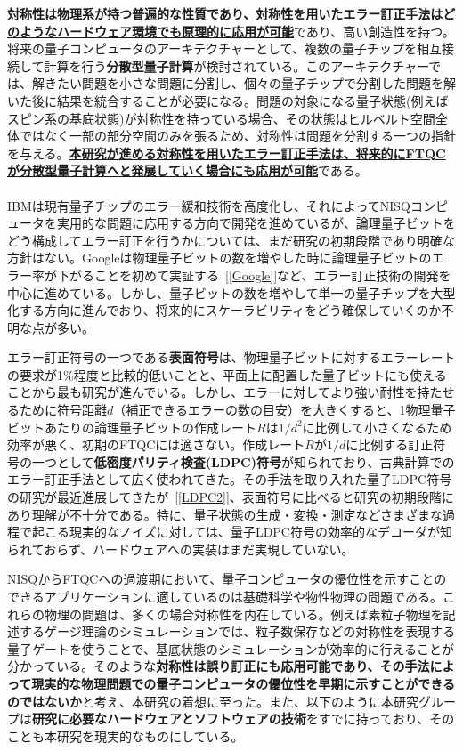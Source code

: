 \documentclass[11pt,a4j,dvipdfmx]{jarticle} 					%
\newcommand{\研究課題名}{誤り耐性量子コンピュータに向けた誤り訂正技術の開発(仮)}
\newcommand{\研究機関名}{東京大学}
\newcommand{\研究代表者氏名}{寺師弘二}
\newcommand{\研究期間の最終元号年度}{10}  %
\newcommand{\mybf}[1]{{\bfseries\sffamily#1}}
\begin{document}
\mybf{対称性は物理系が持つ普遍的な性質であり、\ul{対称性を用いたエラー訂正手法はどのようなハードウェア環境でも原理的に応用が可能}}であり、高い創造性を持つ。将来の量子コンピュータのアーキテクチャーとして、複数の量子チップを相互接続して計算を行う\mybf{分散型量子計算}が検討されている。このアーキテクチャーでは、解きたい問題を小さな問題に分割し、個々の量子チップで分割した問題を解いた後に結果を統合することが必要になる。問題の対象になる量子状態(例えばスピン系の基底状態)が対称性を持っている場合、その状態はヒルベルト空間全体ではなく一部の部分空間のみを張るため、対称性は問題を分割する一つの指針を与える。\mybf{\ul{本研究が進める対称性を用いたエラー訂正手法は、将来的にFTQCが分散型量子計算へと発展していく場合にも応用が可能}}である。\\


\\
IBMは現有量子チップのエラー緩和技術を高度化し、それによってNISQコンピュータを実用的な問題に応用する方向で開発を進めているが、論理量子ビットをどう構成してエラー訂正を行うかについては、まだ研究の初期段階であり明確な方針はない。Googleは物理量子ビットの数を増やした時に論理量子ビットのエラー率が下がることを初めて実証する~[\ref{Google}]など、エラー訂正技術の開発を中心に進めている。しかし、量子ビットの数を増やして単一の量子チップを大型化する方向に進んでおり、将来的にスケーラビリティをどう確保していくのか不明な点が多い。

エラー訂正符号の一つである\mybf{表面符号}は、物理量子ビットに対するエラーレートの要求が1\%程度と比較的低いことと、平面上に配置した量子ビットにも使えることから最も研究が進んでいる。しかし、エラーに対してより強い耐性を持たせるために符号距離$d$（補正できるエラーの数の目安）を大きくすると、1物理量子ビットあたりの論理量子ビットの作成レート$R$は$1/d^2$に比例して小さくなるため効率が悪く、初期のFTQCには適さない。作成レート$R$が$1/d$に比例する訂正符号の一つとして\mybf{低密度パリティ検査(LDPC)符号}が知られており、古典計算でのエラー訂正手法として広く使われてきた。その手法を取り入れた量子LDPC符号の研究が最近進展してきたが~[\ref{LDPC2}]、表面符号に比べると研究の初期段階にあり理解が不十分である。特に、量子状態の生成・変換・測定などさまざまな過程で起こる現実的なノイズに対しては、量子LDPC符号の効率的なデコーダが知られておらず、ハードウェアへの実装はまだ実現していない。

NISQからFTQCへの過渡期において、量子コンピュータの優位性を示すことのできるアプリケーションに適しているのは基礎科学や物性物理の問題である。これらの物理の問題は、多くの場合対称性を内在している。例えば素粒子物理を記述するゲージ理論のシミュレーションでは、粒子数保存などの対称性を表現する量子ゲートを使うことで、基底状態のシミュレーションが効率的に行えることが分かっている。そのような\mybf{対称性は誤り訂正にも応用可能であり、その手法によって\ul{現実的な物理問題での量子コンピュータの優位性を早期に示すことができる}のではないか}と考え、本研究の着想に至った。また、以下のように本研究グループは\mybf{研究に必要なハードウェアとソフトウェアの技術}をすでに持っており、そのことも本研究を現実的なものにしている。
\end{document}
